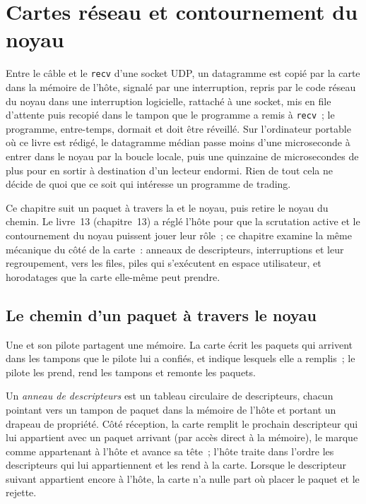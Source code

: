 \chapter{Cartes réseau et contournement du noyau}\label{ch:nw:network-cards-and-kernel-bypass}

Entre le câble et le \texttt{recv} d'une socket UDP, un datagramme est copié par la carte dans la mémoire de l'hôte, signalé par une
interruption, repris par le code réseau du noyau dans une interruption logicielle, rattaché à une socket, mis en file d'attente puis
recopié dans le tampon que le programme a remis à \texttt{recv}~; le programme, entre-temps, dormait et doit être réveillé. Sur
l'ordinateur portable où ce livre est rédigé, le datagramme médian passe moins d'une microseconde à entrer dans le noyau par la boucle locale, puis une quinzaine
de microsecondes de plus pour en sortir à destination d'un lecteur endormi. Rien de tout cela ne décide de quoi que ce soit qui intéresse un programme de trading.

Ce chapitre suit un paquet à travers la  et le noyau, puis retire le noyau du chemin. Le
livre~13 (chapitre~13) a réglé l'hôte pour que la scrutation active et le contournement du noyau puissent jouer leur rôle~; ce chapitre examine la même
mécanique du côté de la carte~: anneaux de descripteurs, interruptions et leur regroupement,  vers les files, piles
qui s'exécutent en espace utilisateur, et horodatages que la carte elle-même peut prendre.

\section{Le chemin d'un paquet à travers le noyau}

Une  et son pilote partagent une mémoire. La carte écrit les paquets qui arrivent dans les tampons que le pilote lui a
confiés, et indique lesquels elle a remplis~; le pilote les prend, rend les tampons et remonte les paquets.

\begin{definition}\label{def:nw:network-cards-and-kernel-bypass:ring}
Un \emph{anneau de descripteurs} est un tableau circulaire de descripteurs, chacun pointant vers un tampon de paquet dans la mémoire de l'hôte
et portant un drapeau de propriété. Côté réception, la carte remplit le prochain descripteur qui lui appartient avec un paquet arrivant (par accès direct
à la mémoire), le marque comme appartenant à l'hôte et avance sa tête~; l'hôte traite dans l'ordre les descripteurs qui lui appartiennent et les rend
à la carte. Lorsque le descripteur suivant appartient encore à l'hôte, la carte n'a nulle part où placer le paquet et le rejette.
\end{definition}

